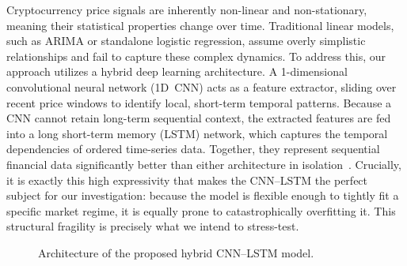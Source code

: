 \documentclass{article}
\begin{document}
Cryptocurrency price signals are inherently non-linear and non-stationary, meaning their statistical
properties change over time. Traditional linear models, such as ARIMA or standalone logistic
regression, assume overly simplistic relationships and fail to capture these complex dynamics. To
address this, our approach utilizes a hybrid deep learning architecture. A 1-dimensional convolutional
neural network (1D~CNN) acts as a feature extractor, sliding over recent price windows to identify
local, short-term temporal patterns. Because a CNN cannot retain long-term sequential context, the
extracted features are fed into a long short-term memory (LSTM) network, which captures the temporal
dependencies of ordered time-series data. Together, they represent sequential financial data
significantly better than either architecture in isolation~\citep{guo2021mrclstm}. Crucially, it is
exactly this high expressivity that makes the CNN--LSTM the perfect subject for our investigation:
because the model is flexible enough to tightly fit a specific market regime, it is equally prone to
catastrophically overfitting it. This structural fragility is precisely what we intend to stress-test.

\begin{figure}[t]
\centering
{}
\caption{Architecture of the proposed hybrid CNN--LSTM model.}
\label{fig:architecture}
\end{figure}
\end{document}
